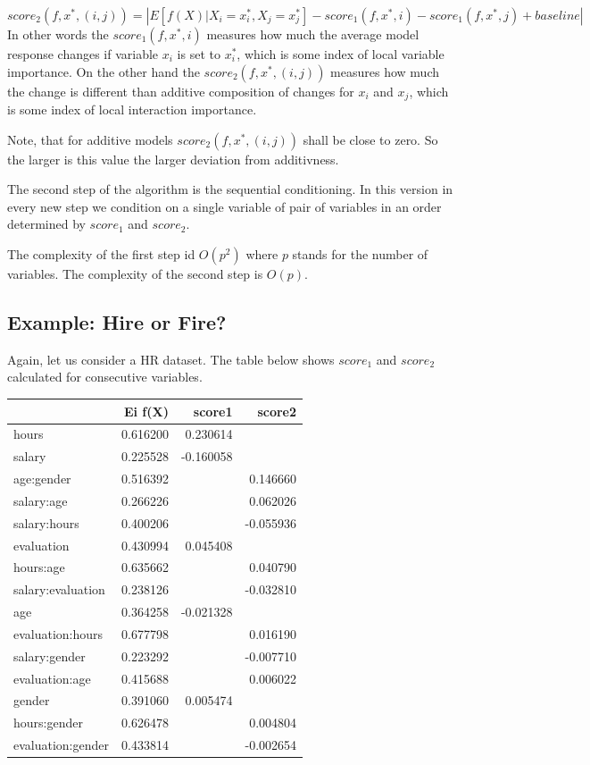 \documentclass[12pt,]{krantz}
\theoremstyle{definition}
\theoremstyle{definition}
\theoremstyle{definition}
\theoremstyle{remark}
\begin{document}
\[
score_2(f, x^*, (i,j)) = \left| E [f(X)|X_i = x^*_i, X_j = x^*_j] - score_1 (f, x^*, i) - score_1 (f, x^*, j) + baseline \right|
\] In other words the \(score_1(f, x^*, i)\) measures how much the
average model response changes if variable \(x_i\) is set to \(x_i^*\),
which is some index of local variable importance. On the other hand the
\(score_2(f, x^*, (i,j))\) measures how much the change is different
than additive composition of changes for \(x_i\) and \(x_j\), which is
some index of local interaction importance.

Note, that for additive models \(score_2(f, x^*, (i,j))\) shall be close
to zero. So the larger is this value the larger deviation from
additivness.

The second step of the algorithm is the sequential conditioning. In this
version in every new step we condition on a single variable of pair of
variables in an order determined by \(score_1\) and \(score_2\).

The complexity of the first step id \(O(p^2)\) where \(p\) stands for
the number of variables. The complexity of the second step is \(O(p)\).

\hypertarget{example-hire-or-fire-1}{%
\subsection{Example: Hire or Fire?}\label{example-hire-or-fire-1}}

Again, let us consider a HR dataset. The table below shows \(score_1\)
and \(score_2\) calculated for consecutive variables.

\begin{longtable}[]{@{}lrrr@{}}
\toprule
& Ei f(X) & score1 & score2\tabularnewline
\midrule
\endhead
hours & 0.616200 & 0.230614 &\tabularnewline
salary & 0.225528 & -0.160058 &\tabularnewline
age:gender & 0.516392 & & 0.146660\tabularnewline
salary:age & 0.266226 & & 0.062026\tabularnewline
salary:hours & 0.400206 & & -0.055936\tabularnewline
evaluation & 0.430994 & 0.045408 &\tabularnewline
hours:age & 0.635662 & & 0.040790\tabularnewline
salary:evaluation & 0.238126 & & -0.032810\tabularnewline
age & 0.364258 & -0.021328 &\tabularnewline
evaluation:hours & 0.677798 & & 0.016190\tabularnewline
salary:gender & 0.223292 & & -0.007710\tabularnewline
evaluation:age & 0.415688 & & 0.006022\tabularnewline
gender & 0.391060 & 0.005474 &\tabularnewline
hours:gender & 0.626478 & & 0.004804\tabularnewline
evaluation:gender & 0.433814 & & -0.002654\tabularnewline
\bottomrule
\end{longtable}
\end{document}
